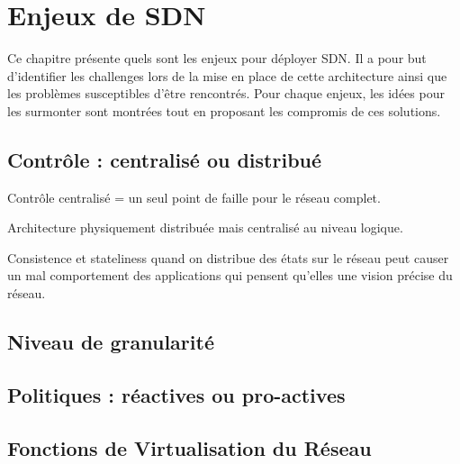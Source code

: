 \chapter{Enjeux de SDN}

Ce chapitre présente quels sont les enjeux pour déployer SDN. Il a pour but d'identifier les challenges lors de la mise en place de cette architecture ainsi que les problèmes susceptibles d'être rencontrés. Pour chaque enjeux, les idées pour les surmonter sont montrées tout en proposant les compromis de ces solutions.

\section{Contrôle : centralisé ou distribué}
Contrôle centralisé = un seul point de faille pour le réseau complet.

Architecture physiquement distribuée mais centralisé au niveau logique.

Consistence et stateliness quand on distribue des états sur le réseau peut causer un mal comportement des applications qui pensent qu'elles une vision précise du réseau.

\section{Niveau de granularité}

\section{Politiques : réactives ou pro-actives}

\section{Fonctions de Virtualisation du Réseau}
